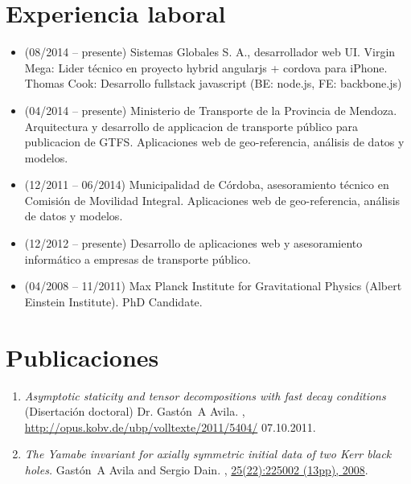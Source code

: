 \documentclass[a4paper]{article}
\begin{document}
\section{Experiencia laboral}
\begin{itemize}
 \item (08/2014 -- presente) Sistemas Globales S. A., desarrollador web UI. 
  \subitem Virgin Mega: Lider técnico en proyecto hybrid angularjs + cordova para iPhone.
  \subitem Thomas Cook: Desarrollo fullstack javascript (BE: node.js, FE: backbone.js)

 \item (04/2014 -- presente) Ministerio de Transporte de la Provincia de Mendoza. Arquitectura 
 y desarrollo de applicacion de transporte público para publicacion de GTFS. 
 Aplicaciones web de geo-referencia, análisis de datos y modelos.

 \item (12/2011 -- 06/2014) Municipalidad de Córdoba, asesoramiento técnico en 
 Comisión de Movilidad Integral. Aplicaciones web de geo-referencia, análisis de
datos y modelos.

 \item (12/2012 -- presente) Desarrollo de aplicaciones web y asesoramiento 
 informático a empresas de transporte público. 

 \item (04/2008 -- 11/2011) Max Planck Institute for Gravitational Physics
(Albert Einstein Institute). PhD Candidate.
\end{itemize}

\section{Publicaciones}
\begin{enumerate}
\item \newblock \emph{Asymptotic staticity and tensor decompositions with fast
decay conditions}
\newblock (Disertación doctoral)
\newblock Dr. Gast\'{o}n~A Avila.
,
\url{http://opus.kobv.de/ubp/volltexte/2011/5404/} 07.10.2011.
\item \newblock \emph{The Yamabe invariant for axially symmetric initial data of
two Kerr black holes.}
\newblock Gast\'{o}n~A Avila and Sergio Dain.
,
\href{http://dx.doi.org/10.1088/0264-9381/25/22/225002}{25(22):225002 (13pp),
2008}.
\end{enumerate}
\end{document}
